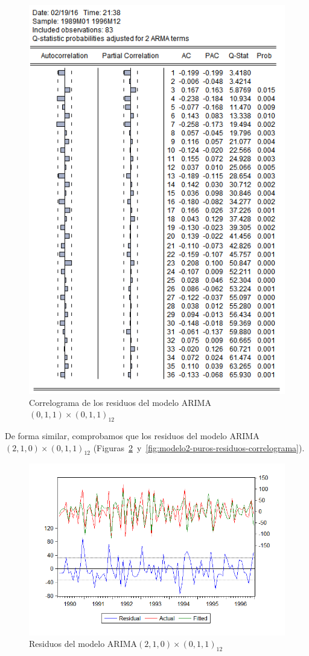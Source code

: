 \documentclass[12pt,a4paper,twoside,openright,titlepage,final]{article}
\begin{document}
\begin{figure}[tbph!]
	\centering
	\includegraphics[width=0.8\linewidth]{imagenes/puros/modelo1-residuos-correlograma.png}
	\caption{Correlograma de los residuos del modelo ARIMA$(0,1,1)\times(0,1,1)_{12}$}
	\label{fig:modelo1-puros-residuos-correlograma}
\end{figure}

De forma similar, comprobamos que los residuos del modelo ARIMA$(2,1,0)\times(0,1,1)_{12}$ (Figuras~\ref{fig:modelo2-puros-residuos}~y~\ref{fig:modelo2-puros-residuos-correlograma}). 

\begin{figure}[tbph!]
	\centering
	\includegraphics[width=0.8\linewidth]{imagenes/puros/modelo2-residuos.png}
	\caption{Residuos del modelo ARIMA$(2,1,0)\times(0,1,1)_{12}$}
	\label{fig:modelo2-puros-residuos}
\end{figure}
\end{document}
